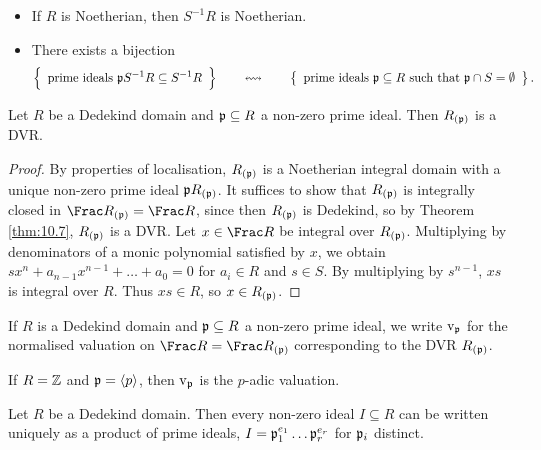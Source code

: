 \begin{fact*}
\hfill
\begin{itemize}
\item If $ R $ is Noetherian, then $ S^{-1}R $ is Noetherian.
\item There exists a bijection
$$ \correspondence{\text{prime ideals} \ \ppp S^{-1}R \subseteq S^{-1}R}{\text{prime ideals} \ \ppp \subseteq R \ \text{such that} \ \ppp \cap S = \emptyset}. $$
\end{itemize}
\end{fact*}

\begin{corollary}
\label{cor:11.1}
Let $ R $ be a Dedekind domain and $ \mathfrak{p} \subseteq R $ a non-zero prime ideal. Then $ R_{\br{\ppp}} $ is a DVR.
\end{corollary}

\begin{proof}
By properties of localisation, $ R_{\br{\ppp}} $ is a Noetherian integral domain with a unique non-zero prime ideal $ \ppp R_{\br{\ppp}} $. It suffices to show that $ R_{\br{\ppp}} $ is integrally closed in $ \Frac R_{\br{\ppp}} = \Frac R $, since then $ R_{\br{\ppp}} $ is Dedekind, so by Theorem \ref{thm:10.7}, $ R_{\br{\ppp}} $ is a DVR. Let $ x \in \Frac R $ be integral over $ R_{\br{\ppp}} $. Multiplying by denominators of a monic polynomial satisfied by $ x $, we obtain $ sx^n + a_{n - 1}x^{n - 1} + \dots + a_0 = 0 $ for $ a_i \in R $ and $ s \in S $. By multiplying by $ s^{n - 1} $, $ xs $ is integral over $ R $. Thus $ xs \in R $, so $ x \in R_{\br{\ppp}} $.
\end{proof}

\begin{definition}
If $ R $ is a Dedekind domain and $ \mathfrak{p} \subseteq R $ a non-zero prime ideal, we write $ \mathrm{v}_{\mathfrak{p}} $ for the normalised valuation on $ \Frac R = \Frac R_{\br{\ppp}} $ corresponding to the DVR $ R_{\br{\ppp}} $.
\end{definition}

\begin{example*}
If $ R = \mathbb{Z} $ and $ \mathfrak{p} = \left\langle p \right\rangle $, then $ \mathrm{v}_{\mathfrak{p}} $ is the $ p $-adic valuation.
\end{example*}

\begin{theorem}
Let $ R $ be a Dedekind domain. Then every non-zero ideal $ I \subseteq R $ can be written uniquely as a product of prime ideals, $ I = \mathfrak{p}_1^{e_1} \dots \mathfrak{p}_r^{e_r} $ for $ \mathfrak{p}_i $ distinct.
\end{theorem}

